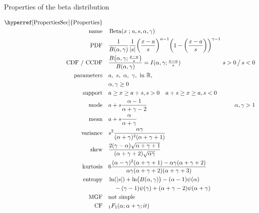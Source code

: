 

\begin{table*}[tp]
\caption[Beta distribution -- Properties]{Properties of the beta distribution}
 \begin{align*}
 \text{\hyperref[PropertiesSec]{Properties}}  \quad& \\
\text{name} \quad & \op{Beta}(x\given a,s,\alpha, \gamma) 	\checked
\\
\text{PDF}\quad &    \frac{1}{B(\alpha, \gamma)}\frac{1}{ \Left|s\Right|}
\Left(\frac{x-a}{s} \Right)^{\alpha -1} \Left (1-\Left(\frac{x-a}{s}\Right)\Right)^{\gamma -1}	\checked
\hspace{-8em}
\\
\text{CDF / CCDF} \quad  & 
 \frac{B\Left( \alpha,\gamma; \sfrac{x-a}{s} \Right)}{B(\alpha,\gamma)} = I( \alpha,\gamma; \sfrac{x-a}{s})
 \checked
& {s} >0 \,\big/ \, {s} <0
\\ 
\text{parameters}\quad &   a,\ s,\ \alpha,\ \gamma, \text{ in } \Real, \\ &  \alpha,\gamma\geq0	\checked
\\
\text{support} \quad &  a \geq x \geq a+s , s>0 \quad a+s \geq x \geq a , s<0 
\\
\text{mode} \quad  &a + s \frac{\alpha-1}{\alpha+\gamma-2}\checked  & \alpha,\gamma > 1
\\
\text{mean} \quad  &   a + s \frac{\alpha}{\alpha+\gamma}	\checked
\\
\text{variance} \quad   & s^2 \frac{\alpha\gamma}{(\alpha+\gamma)^2(\alpha+\gamma+1)} \checked
\\
\text{skew} \quad  &   \frac{2(\gamma-\alpha) \sqrt{\alpha+\gamma+1} }{(\alpha+\gamma+2)\sqrt{\alpha\gamma} } \checked
\\
\text{kurtosis} \quad  &  6\frac{(\alpha-\gamma)^2(\alpha+\gamma+1) - \alpha\gamma(\alpha+\gamma+2) }{\alpha\gamma(\alpha+\gamma+2)(\alpha+\gamma+3)} \checked
\\
\text{entropy} \quad  &  \ln(|s|) + \ln\bigl(B(\alpha,\gamma)\bigr)-(\alpha-1)\psi(\alpha)
\\ &\quad {}-(\gamma-1)\psi(\gamma)+(\alpha+\gamma-2)\psi(\alpha+\gamma) \checked
\\
\text{MGF} \quad  &  \text{not simple} 
\\
\text{CF} \quad  &  {}_{1}F_{1}(\alpha; \alpha+\gamma ; i t) \checked
\end{align*}
\end{table*}

